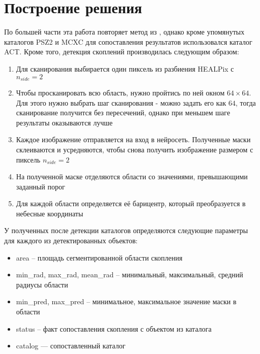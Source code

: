 \chapter{Построение решения}
\label{cha:ch_3}
По большей части эта работа повторяет метод из \cite{Bonjean}, однако кроме упомянутых каталогов 
PSZ2 и MCXC для сопоставления результатов использовался каталог ACT. Кроме того, детекция скоплений 
производилась следующим образом:\\

\begin{enumerate}
    \item Для сканирования выбирается один пиксель из разбиения HEALPix с $n_{side} = 2$\\
    \item Чтобы просканировать всю область, нужно пройтись по ней окном $64 \times 64$. Для этого 
        нужно выбрать шаг сканирования - можно задать его как $64$, тогда сканирование получится 
        без пересечений, однако при меньшем шаге результаты оказываются лучше\\
    \item Каждое изображение отправляется на вход в нейросеть. Полученные маски склеиваются и 
        усредняются, чтобы снова получить изображение размером с пиксель $n_{side} = 2$\\
    \item На полученной маске отделяются области со значениями, превышающими заданный порог\\
    \item Для каждой области определяется её барицентр, который преобразуется в небесные координаты\\
\end{enumerate}

У полученных после детекции каталогов определяются следующие параметры для каждого из 
детектированных объектов:\\
\begin{itemize}
    \item area – площадь сегментированной области скопления\\
    \item min\_rad, max\_rad, mean\_rad – минимальный, максимальный, средний радиусы области\\
    \item min\_pred, max\_pred – минимальное, максимальное значение маски в области\\
    \item status – факт сопоставления скопления с объектом из каталога\\
    \item catalog --- сопоставленный каталог\\ 
\end{itemize}

